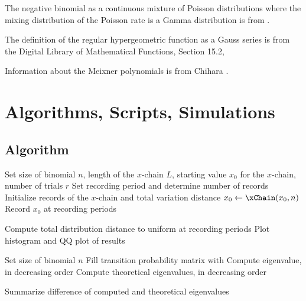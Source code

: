 \documentclass[12pt]{article}
\begin{document}
The negative binomial as a continuous mixture of Poisson distributions
where the mixing distribution of the Poisson rate is a Gamma
distribution is from .

The definition of the regular hypergeometric function as a Gauss series
is from the Digital Library of Mathematical Functions, Section 15.2,

Information about the Meixner polynomials is from Chihara
\cite{chihara78}.

\hr

\section*{Algorithms, Scripts, Simulations}

\subsection*{Algorithm}

\begin{algorithm}
  \DontPrintSemicolon


  Set size of binomial \(n\), length of the \(x\)-chain \( L \),
  starting value \(x_0\) for the \(x\)-chain, number of trials \(r\)\;
  Set recording period and determine number of records\;
  Initialize records of the \(x\)-chain and total variation distance\;
   {
     {
      \( x_0 \leftarrow \xChain(x_0, n) \)\;
      Record \(x_0 \) at recording periods\;
    }
  }

  Compute total distribution distance to uniform at recording periods\;
  Plot histogram and QQ plot of results\;
\end{algorithm}

\begin{algorithm}
  \DontPrintSemicolon

  
  Set size of binomial \( n \)\;
  Fill transition probability matrix with \Pxxp
  Compute eigenvalue, in decreasing order\;
  Compute theoretical eigenvalues, in decreasing order\;

  Summarize difference of computed and theoretical eigenvalues\;
\end{algorithm}
\end{document}
